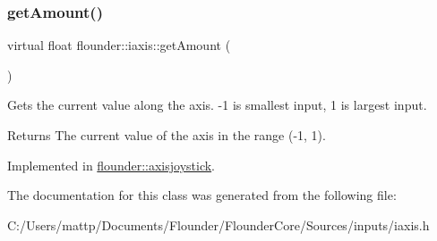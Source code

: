 \subsubsection{\texorpdfstring{get\+Amount()}{getAmount()}}
{\footnotesize\ttfamily virtual float flounder\+::iaxis\+::get\+Amount (\begin{DoxyParamCaption}{ }\end{DoxyParamCaption})\hspace{0.3cm}{\ttfamily [pure virtual]}}



Gets the current value along the axis. -\/1 is smallest input, 1 is largest input. 

\begin{DoxyReturn}{Returns}
The current value of the axis in the range (-\/1, 1). 
\end{DoxyReturn}


Implemented in \hyperlink{classflounder_1_1axisjoystick_ace3ec0cbb5c9958fe8e8fb6996fc81c3}{flounder\+::axisjoystick}.



The documentation for this class was generated from the following file\+:\begin{DoxyCompactItemize}
\item 
C\+:/\+Users/mattp/\+Documents/\+Flounder/\+Flounder\+Core/\+Sources/inputs/iaxis.\+h\end{DoxyCompactItemize}
